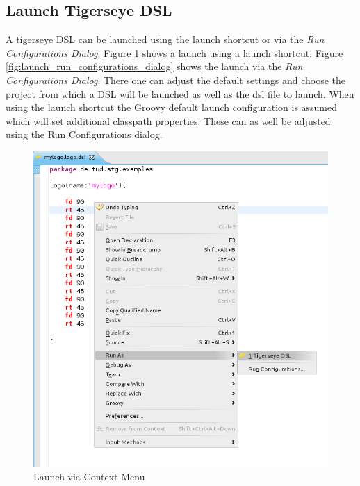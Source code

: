 \documentclass[article,colorback,accentcolor=tud4c]{tudreport}
\begin{document}
	
	\subsection{Launch Tigerseye DSL}
	  A tigerseye DSL can be launched using the launch shortcut or via the \textit{Run Configurations Dialog}. Figure \ref{fig:launch_shortcut} shows a launch using a launch shortcut. Figure  \ref{fig:launch_run_configurations_dialog} shows the launch via the \emph{Run Configurations Dialog}. There one can adjust the default settings and choose the project from which a DSL will be launched as well as the dsl file to launch. When using the launch shortcut the Groovy default launch configuration is assumed which will set additional classpath properties. These can as well be adjusted using the Run Configurations dialog.
	
	\begin{figure}
 \centering
 \includegraphics[scale=0.5]{./pics/launch_shortcut.png}
 \caption{Launch via Context Menu}
 \label{fig:launch_shortcut}
\end{figure}
\end{document}
